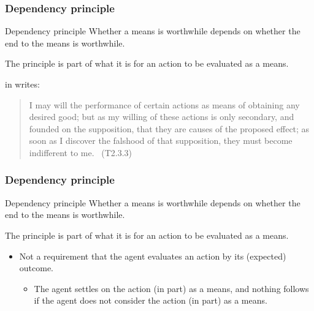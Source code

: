 \documentclass[noamssymb,
]{beamer} %
\newcommand{\hand}{\ding{43}}
\begin{document}
\begin{frame}
  \frametitle{Dependency principle}

  \begin{block}{Dependency principle}
    Whether a means is worthwhile depends on whether the end to the means is worthwhile.
  \end{block}

The principle is part of what it is for an action to be evaluated as a means.

\citeauthor{Hume:2011aa} in  writes:

\begin{quote}
  I may will the performance of certain actions as means of obtaining any desired good; but as my willing of these actions is only secondary, and founded on the supposition, that they are causes of the proposed effect; as soon as I discover the falshood of that supposition, they must become indifferent to me.\nolinebreak
  \mbox{ }\hfill\mbox{\hfill(T2.3.3)}
\end{quote}

\end{frame}


\begin{frame}
  \frametitle{Dependency principle}

  \begin{block}{Dependency principle}
    Whether a means is worthwhile depends on whether the end to the means is worthwhile.
  \end{block}

The principle is part of what it is for an action to be evaluated as a means.


\begin{itemize}
\item[\hand] Not a requirement that the agent evaluates an action by its (expected) outcome.
  \begin{itemize}
  \item The agent settles on the action (in part) as a means, and nothing follows if the agent does not consider the action (in part) as a means.
  \end{itemize}
\end{itemize}
\end{frame}
\end{document}
